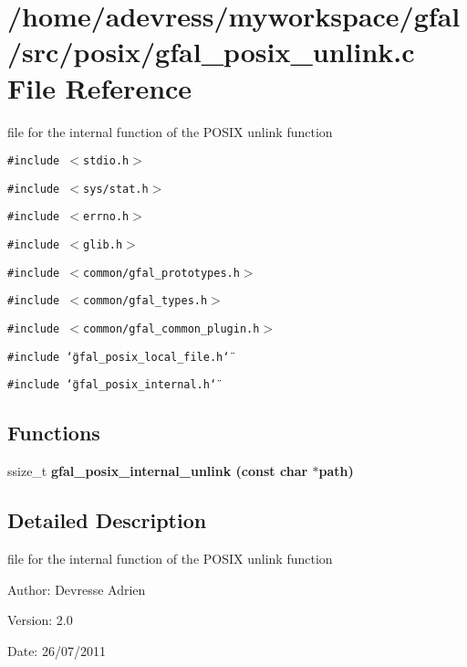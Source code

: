 \section{/home/adevress/myworkspace/gfal/src/posix/gfal\_\-posix\_\-unlink.c File Reference}
\label{gfal__posix__unlink_8c}
file for the internal function of the POSIX unlink function 

{\tt \#include $<$stdio.h$>$}\par
{\tt \#include $<$sys/stat.h$>$}\par
{\tt \#include $<$errno.h$>$}\par
{\tt \#include $<$glib.h$>$}\par
{\tt \#include $<$common/gfal\_\-prototypes.h$>$}\par
{\tt \#include $<$common/gfal\_\-types.h$>$}\par
{\tt \#include $<$common/gfal\_\-common\_\-plugin.h$>$}\par
{\tt \#include \char`\"{}gfal\_\-posix\_\-local\_\-file.h\char`\"{}}\par
{\tt \#include \char`\"{}gfal\_\-posix\_\-internal.h\char`\"{}}\par
\subsection*{Functions}
\begin{CompactItemize}
\item 
ssize\_\-t \bf{gfal\_\-posix\_\-internal\_\-unlink} (const char $\ast$path)
\end{CompactItemize}


\subsection{Detailed Description}
file for the internal function of the POSIX unlink function 

\begin{Desc}
\item[Author:]Devresse Adrien \end{Desc}
\begin{Desc}
\item[Version:]2.0 \end{Desc}
\begin{Desc}
\item[Date:]26/07/2011 \end{Desc}


